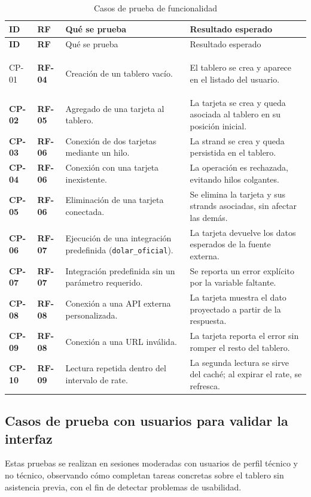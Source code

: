 \begin{longtable}{>{\bfseries}l >{\bfseries}l p{} p{}}
  \toprule
  ID & RF & Qué se prueba & Resultado esperado \\
  \midrule
  \endfirsthead
  \toprule
  ID & RF & Qué se prueba & Resultado esperado \\
  \midrule
  \endhead
  \bottomrule
  \caption{Casos de prueba de funcionalidad}
  \label{tab:cp_funcionalidad}
  \endfoot
  CP-01 & RF-04 & Creación de un tablero vacío. & El tablero se crea y aparece en el listado del usuario. \\
  CP-02 & RF-05 & Agregado de una tarjeta al tablero. & La tarjeta se crea y queda asociada al tablero en su posición inicial. \\
  CP-03 & RF-06 & Conexión de dos tarjetas mediante un hilo. & La strand se crea y queda persistida en el tablero. \\
  CP-04 & RF-06 & Conexión con una tarjeta inexistente. & La operación es rechazada, evitando hilos colgantes. \\
  CP-05 & RF-06 & Eliminación de una tarjeta conectada. & Se elimina la tarjeta y sus strands asociadas, sin afectar las demás. \\
  CP-06 & RF-07 & Ejecución de una integración predefinida (\texttt{dolar\_oficial}). & La tarjeta devuelve los datos esperados de la fuente externa. \\
  CP-07 & RF-07 & Integración predefinida sin un parámetro requerido. & Se reporta un error explícito por la variable faltante. \\
  CP-08 & RF-08 & Conexión a una API externa personalizada. & La tarjeta muestra el dato proyectado a partir de la respuesta. \\
  CP-09 & RF-08 & Conexión a una URL inválida. & La tarjeta reporta el error sin romper el resto del tablero. \\
  CP-10 & RF-09 & Lectura repetida dentro del intervalo de rate. & La segunda lectura se sirve del caché; al expirar el rate, se refresca. \\
\end{longtable}

\subsection{Casos de prueba con usuarios para validar la interfaz}
Estas pruebas se realizan en sesiones moderadas con usuarios de perfil técnico y no técnico, observando cómo completan tareas concretas sobre el tablero sin asistencia previa, con el fin de detectar problemas de usabilidad.

